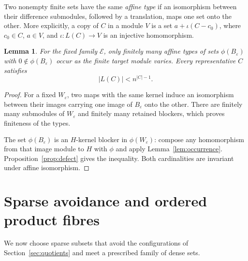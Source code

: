 \documentclass[11pt,reqno]{amsart}
\newtheorem{lemma}[theorem]{Lemma}
\theoremstyle{definition}
\numberwithin{equation}{section}
\newcommand{\calE}{\mathcal{E}}
\begin{document}
Two nonempty finite sets have the same \emph{affine type} if an isomorphism between their difference submodules, followed by a translation, maps one set onto the other. More explicitly, a copy of $C$ in a module $V$ is a set $a+\iota(C-c_0)$, where $c_0\in C$, $a\in V$, and $\iota:L(C)\to V$ is an injective homomorphism.

\begin{lemma}\label{lem:types}
For the fixed family $\calE$, only finitely many affine types of sets $\phi(B_\varepsilon)$ with $0\notin\phi(B_\varepsilon)$ occur as the finite target module varies. Every representative $C$ satisfies
\[
 |L(C)|<n^{|C|-1}.
\]
\end{lemma}
\begin{proof}
For a fixed $W_\varepsilon$, two maps with the same kernel induce an isomorphism between their images carrying one image of $B_\varepsilon$ onto the other. There are finitely many submodules of $W_\varepsilon$ and finitely many retained blockers, which proves finiteness of the types.

The set $\phi(B_\varepsilon)$ is an $H$-kernel blocker in $\phi(W_\varepsilon)$: compose any homomorphism from that image module to $H$ with $\phi$ and apply Lemma~\ref{lem:occurrence}. Proposition~\ref{prop:defect} gives the inequality. Both cardinalities are invariant under affine isomorphism.
\end{proof}

\section{Sparse avoidance and ordered product fibres}\label{sec:sparse}
We now choose sparse subsets that avoid the configurations of Section~\ref{sec:quotients} and meet a prescribed family of dense sets.
\end{document}
